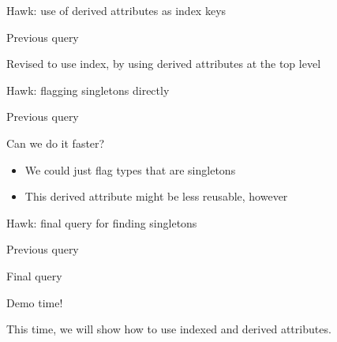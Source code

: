 \documentclass[10pt]{beamer}
\begin{document}
\begin{frame}{Hawk: use of derived attributes as index keys}

  \begin{block}{Previous query}
    
  \end{block}

  \begin{block}{Revised to use index, by using derived attributes at the top level}
    
  \end{block}

\end{frame}

\begin{frame}[fragile]{Hawk: flagging singletons directly}
  \begin{block}{Previous query}
    
  \end{block}

  \begin{block}{Can we do it faster?}
    \begin{itemize}
    \item We could just flag types that are singletons
    \item This derived attribute might be less reusable, however
    \end{itemize}
  \end{block}
\end{frame}

\begin{frame}[fragile]{Hawk: final query for finding singletons}
  \begin{block}{Previous query}
    
  \end{block}

  \begin{block}{Final query}
    
  \end{block}
\end{frame}

\begin{frame}[standout]
  Demo time!

  This time, we will show how to use indexed and derived attributes.
\end{frame}
\end{document}
